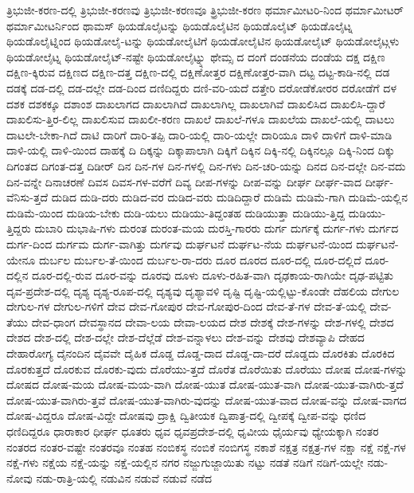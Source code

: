 {ತ್ರಿಭುಜೀ-ಕರಣ-ದಲ್ಲಿ
ತ್ರಿಭುಜೀ-ಕರಣವು
ತ್ರಿಭುಜೀ-ಕರಣವೂ
ತ್ರ್ರಿಭುಜೀ-ಕರಣ
ಥರ್ಮಾಮೀಟರಿ-ನಿಂದ
ಥರ್ಮಾಮೀಟರ್
ಥರ್ಮಾಮೀಟರ್ನಿಂದ
ಥಾಮಸ್
ಥಿಯಡೊಲೈಟನ್ನು
ಥಿಯಡೊಲೈಟಿನ
ಥಿಯಡೊಲೈಟ್
ಥಿಯಡೊಲೈಟ್ನ
ಥಿಯಡೊಲೈಟ್ನಿಂದ
ಥಿಯಡೋಲೈ-ಟನ್ನು
ಥಿಯಡೋಲೈಟಿಗೆ
ಥಿಯಡೋಲೈಟಿನ
ಥಿಯಡೋಲೈಟ್
ಥಿಯಡೋಲೈಟ್ಗಳು
ಥಿಯಡೋಲೈಟ್ನ
ಥಿಯಡೋಲೈಟ್-ನಷ್ಟೇ
ಥಿಯಡೋಲೈಟ್ನ್ನು
ಥೇಮ್ಸ
ದ
ದಂಗೆ
ದಂಡನೆಯ
ದಂಡೆಯ
ದಕ್ಷ
ದಕ್ಷಿಣ
ದಕ್ಷಿಣ-ಕ್ಕಿರುವ
ದಕ್ಷಿಣದ
ದಕ್ಷಿಣ-ದತ್ತ
ದಕ್ಷಿಣ-ದಲ್ಲಿ
ದಕ್ಷಿಣೋತ್ತರ
ದಕ್ಷಿಣೋತ್ತರ-ವಾಗಿ
ದಟ್ಟ
ದಟ್ಟ-ಕಾಡಿ-ನಲ್ಲಿ
ದಡ
ದಡಕ್ಕೆ
ದಡ-ದಲ್ಲಿ
ದಡ-ದಲ್ಲೇ
ದಡ-ದಿಂದ
ದಣಿದಿದ್ದರು
ದಣಿ-ವರಿ-ಯದೆ
ದತ್ತೇರಿ
ದರೋಡೆಕೋರರ
ದರೋಡೆಗೆ
ದಳ
ದಶಕ
ದಶಕಕ್ಕೂ
ದಶಾಂಶ
ದಾಖಲಾಗದ
ದಾಖಲಾಗಿದೆ
ದಾಖಲಾಗಿಲ್ಲ
ದಾಖಲಾಗಿವೆ
ದಾಖಲಿಸಿದ
ದಾಖಲಿಸಿ-ದ್ದಾರೆ
ದಾಖಲಿಸು-ತ್ತಿರ-ಲಿಲ್ಲ
ದಾಖಲಿಸುವ
ದಾಖಲೀ-ಕರಣ
ದಾಖಲೆ
ದಾಖಲೆ-ಗಳೂ
ದಾಖಲೆಯ
ದಾಖಲೆ-ಯಲ್ಲಿ
ದಾಟಲು
ದಾಟಲೇ-ಬೇಕಾ-ಗಿದೆ
ದಾಟಿ
ದಾರಿಗೆ
ದಾರಿ-ತಪ್ಪಿ
ದಾರಿ-ಯಲ್ಲಿ
ದಾರಿ-ಯಲ್ಲೇ
ದಾರಿಯೂ
ದಾಳಿ
ದಾಳಿಗೆ
ದಾಳಿ-ಮಾಡಿ
ದಾಳಿ-ಯಲ್ಲಿ
ದಾಳಿ-ಯಿಂದ
ದಾಹಕ್ಕೆ
ದಿ
ದಿಕ್ಕನ್ನು
ದಿಕ್ಕಾಪಾಲಾಗಿ
ದಿಕ್ಕಿಗೆ
ದಿಕ್ಕಿನ
ದಿಕ್ಕಿ-ನಲ್ಲಿ
ದಿಕ್ಕಿನಲ್ಲೂ
ದಿಕ್ಕಿ-ನಿಂದ
ದಿಕ್ಕು
ದಿಗಂತದ
ದಿಗಂತ-ದತ್ತ
ದಿಡೀರ್
ದಿನ
ದಿನ-ಗಳ
ದಿನ-ಗಳಲ್ಲಿ
ದಿನ-ಗಳು
ದಿನ-ಚರಿ-ಯನ್ನು
ದಿನದ
ದಿನ-ದಲ್ಲೇ
ದಿನ-ವದು
ದಿನ-ವನ್ನೇ
ದಿನಾಚರಣೆ
ದಿವಸ
ದಿವಸ-ಗಳ-ವರೆಗೆ
ದಿವ್ಯ
ದೀಪ-ಗಳನ್ನು
ದೀಪ-ವನ್ನು
ದೀರ್ಘ
ದೀರ್ಘ-ವಾದ
ದೀರ್ಘ-ವೆನಿಸು-ತ್ತದೆ
ದುಡಿದ
ದುಡಿ-ದರು
ದುಡಿದ-ವರ
ದುಡಿದ-ವರು
ದುಡಿದಿದ್ದಾರೆ
ದುಡಿಮೆ
ದುಡಿಮೆ-ಗಾಗಿ
ದುಡಿಮೆ-ಯಲ್ಲಿನ
ದುಡಿಮೆ-ಯಿಂದ
ದುಡಿಯ-ಬೇಕು
ದುಡಿ-ಯಲು
ದುಡಿಯು-ತಿದ್ದಂತಹ
ದುಡಿಯುತ್ತಾ
ದುಡಿಯು-ತ್ತಿದ್ದ
ದುಡಿಯು-ತ್ತಿದ್ದರು
ದುಬಾರಿ
ದುಭಾಷಿ-ಗಳು
ದುರಂತ
ದುರಂತ-ಮಯ
ದುರಸ್ತಿ-ಗಾರರು
ದುರ್ಗ
ದುರ್ಗಕ್ಕೆ
ದುರ್ಗ-ಗಳು
ದುರ್ಗದ
ದುರ್ಗ-ದಿಂದ
ದುರ್ಗಮ
ದುರ್ಗ-ವಾಗಿತ್ತು
ದುರ್ಗವು
ದುರ್ಘಟನೆ
ದುರ್ಘಟ-ನೆಯ
ದುರ್ಘಟನೆ-ಯಿಂದ
ದುರ್ಘಟನೆ-ಯೇನೂ
ದುರ್ಬಲ
ದುರ್ಬಲ-ತೆ-ಯಿಂದ
ದುರ್ಬಲ-ರಾ-ದರು
ದೂರ
ದೂರದ
ದೂರ-ದಲ್ಲಿ
ದೂರ-ದಲ್ಲಿದೆ
ದೂರ-ದಲ್ಲಿನ
ದೂರ-ದಲ್ಲಿ-ರುವ
ದೂರ-ವನ್ನು
ದೂರವು
ದೂಳು
ದೂಳು-ರಹಿತ-ವಾಗಿ
ದೃಢಕಾಯ-ರಾಗಿಯೇ
ದೃಢ-ಪಟ್ಟಿತು
ದೃವ-ಪ್ರದೇಶ-ದಲ್ಲಿ
ದೃಶ್ಯ
ದೃಶ್ಯ-ರೂಪ-ದಲ್ಲಿ
ದೃಶ್ಯವು
ದೃಶ್ಯಾವಳಿ
ದೃಷ್ಟಿ
ದೃಷ್ಟಿ-ಯಲ್ಲಿಟ್ಟು-ಕೊಂಡೇ
ದೆಹಲಿಯ
ದೇಗುಲ
ದೇಗುಲ-ಗಳ
ದೇಗುಲ-ಗಳಿಗೆ
ದೇವ
ದೇವ-ಗೋಪುರ
ದೇವ-ಗೋಪುರ-ದಿಂದ
ದೇವ-ತೆ-ಗಳ
ದೇವ-ತೆ-ಯಲ್ಲಿ
ದೇವ-ತೆಯು
ದೇವ-ಧಾಂಗ
ದೇವಸ್ಥಾನದ
ದೇವಾ-ಲಯ
ದೇವಾ-ಲಯದ
ದೇಶ
ದೇಶಕ್ಕೆ
ದೇಶ-ಗಳನ್ನು
ದೇಶ-ಗಳಲ್ಲಿ
ದೇಶದ
ದೇಶದ
ದೇಶ-ದಲ್ಲಿ
ದೇಶ-ದಲ್ಲೇ
ದೇಶ-ದೆಲ್ಲೆಡೆ
ದೇಶ-ವನ್ನಾಳಲು
ದೇಶ-ವನ್ನು
ದೇಶವು
ದೇಶವ್ಯಾಪಿ
ದೇಹದ
ದೇಹಾರೋಗ್ಯ
ದೈನಂದಿನ
ದೈವವೇ
ದೈಹಿಕ
ದೊಡ್ಡ
ದೊಡ್ಡ-ದಾದ
ದೊಡ್ಡ-ದಾ-ದರೆ
ದೊಡ್ಡದು
ದೊರಕಿತು
ದೊರಕಿದ
ದೊರಕುತ್ತದೆ
ದೊರಕುವ
ದೊರಕು-ವುದು
ದೊರೆಯು-ತ್ತದೆ
ದೊರೆತ
ದೊರೆಯಿತು
ದೊರೆಯು
ದೋಷ
ದೋಷ-ಗಳನ್ನು
ದೋಷದ
ದೋಷ-ಮಯ
ದೋಷ-ಮಯ-ವಾಗಿ
ದೋಷ-ಯುತ
ದೋಷ-ಯುತ-ವಾಗಿ
ದೋಷ-ಯುತ-ವಾಗಿರು-ತ್ತದೆ
ದೋಷ-ಯುತ-ವಾಗಿರು-ತ್ತವೆ
ದೋಷ-ಯುತ-ವಾಗಿರು-ವುದನ್ನು
ದೋಷ-ಯುತ-ವಾದ
ದೋಷ-ವನ್ನು
ದೋಷ-ವಾಗದ
ದೋಷ-ವಿದ್ದರೂ
ದೋಷ-ವಿದ್ದೇ
ದೋಷವು
ದ್ರಾಕ್ಷಿ
ದ್ವಿತೀಯಕ
ದ್ವಿಪಾತ್ರ-ದಲ್ಲಿ
ದ್ವೀಪಕ್ಕೆ
ದ್ವೀಪ-ವನ್ನು
ಧಣಿದ
ಧಣಿದಿದ್ದರೂ
ಧಾರಾಕಾರ
ಧೀರ್ಘ
ಧೂತರು
ಧೃವ
ಧೃವಪ್ರದೇಶ-ದಲ್ಲಿ
ಧೃವೀಯ
ಧೈರ್ಯವು
ಧ್ಯೇಯಕ್ಕಾಗಿ
ನಂತರ
ನಂತರದ
ನಂತರ-ವಷ್ಟೇ
ನಂತರವೂ
ನಂತಹ
ನಂಬಿಕಸ್ಥ
ನಂಬಿಕೆ
ನಂಬಿಗಸ್ಥ
ನಕಾಶೆ
ನಕ್ಷತ್ರ
ನಕ್ಷತ್ರ-ಗಳ
ನಕ್ಷಾ
ನಕ್ಷೆ
ನಕ್ಷೆ-ಗಳ
ನಕ್ಷೆ-ಗಳು
ನಕ್ಷೆಯ
ನಕ್ಷೆ-ಯನ್ನು
ನಕ್ಷೆ-ಯಲ್ಲಿನ
ನಗರ
ನಜ್ಜುಗುಜ್ಜಾಯಿತು
ನಟ್ಟು
ನಡತೆ
ನಡಿಗೆ
ನಡಿಗೆ-ಯಲ್ಲೇ
ನಡು-ನೋವು
ನಡು-ರಾತ್ರಿ-ಯಲ್ಲಿ
ನಡುವಿನ
ನಡುವೆ
ನಡುವೆ
ನಡೆದ
}
